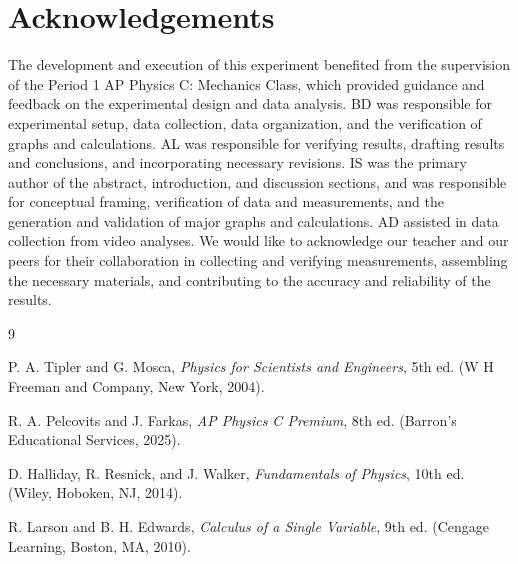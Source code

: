\documentclass[12pt]{article}
\begin{document}
\section{Acknowledgements}
The development and execution of this experiment benefited from the supervision of the Period 1 AP Physics C: Mechanics Class, which provided guidance and feedback on the experimental design and data analysis. BD was responsible for experimental setup, data collection, data organization, and the verification of graphs and calculations. AL was responsible for verifying results, drafting results and conclusions, and incorporating necessary revisions. IS was the primary author of the abstract, introduction, and discussion sections, and was responsible for conceptual framing, verification of data and measurements, and the generation and validation of major graphs and calculations. AD assisted in data collection from video analyses. We would like to acknowledge our teacher and our peers for their collaboration in collecting and verifying measurements, assembling the necessary materials, and contributing to the accuracy and reliability of the results.

\begin{thebibliography}{9}

P. A. Tipler and G. Mosca, \textit{Physics for Scientists and Engineers}, 5th ed. (W H Freeman and Company, New York, 2004).

R. A. Pelcovits and J. Farkas, \textit{AP Physics C Premium}, 8th ed. (Barron’s Educational Services, 2025).

D. Halliday, R. Resnick, and J. Walker, \textit{Fundamentals of Physics}, 10th ed. (Wiley, Hoboken, NJ, 2014).

R. Larson and B. H. Edwards, \textit{Calculus of a Single Variable}, 9th ed. (Cengage Learning, Boston, MA, 2010).

\end{thebibliography}
\end{document}
